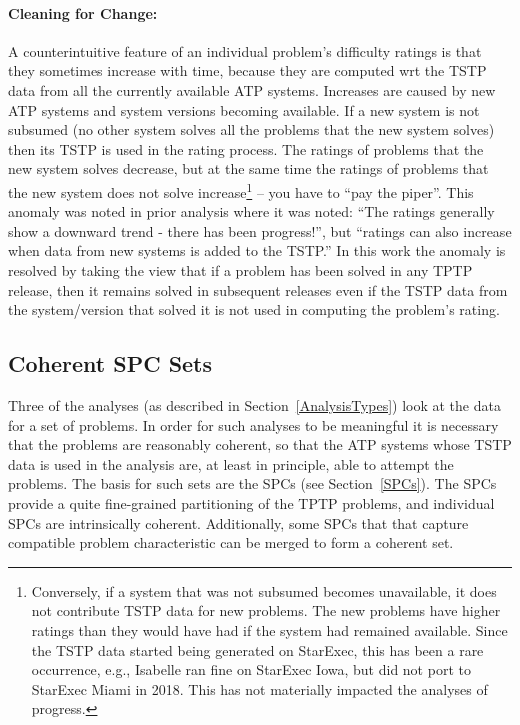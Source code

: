 \documentclass[runningheads]{llncs}
\begin{document}
\paragraph{Cleaning for Change:}
A counterintuitive feature of an individual problem's difficulty ratings is that they sometimes 
increase with time, because they are computed wrt the TSTP data from all the currently available
ATP systems.
Increases are caused by new ATP systems and system versions becoming available.
If a new system is not subsumed (no other system solves all the problems that the new system 
solves) then its TSTP is used in the rating process.
The ratings of problems that the new system solves decrease, but at the same time the ratings of
problems that the new system does not solve increase\footnote{%
Conversely, if a system that was not subsumed becomes unavailable, it does not contribute TSTP
data for new problems.
The new problems have higher ratings than they would have had if the system had remained
available.
Since the TSTP data started being generated on StarExec, this has been a rare occurrence, e.g.,
Isabelle ran fine on StarExec Iowa, but did not port to StarExec Miami in 2018.
This has not materially impacted the analyses of progress.} -- you have to ``pay the piper''.
This anomaly was noted in prior analysis \cite{Sut17} where it was noted: ``The ratings generally 
show a downward trend - there has been progress!'', but ``ratings can also increase when data 
from new systems is added to the TSTP.''
In this work the anomaly is resolved by taking the view that if a problem has been solved in any 
TPTP release, then it remains solved in subsequent releases even if the TSTP data from the 
system/version that solved it is not used in computing the problem's rating.

\subsection{Coherent SPC Sets}
\label{SPCSets}

Three of the analyses (as described in Section~\ref{AnalysisTypes}) look at the data for a set
of problems.
In order for such analyses to be meaningful it is necessary that the problems are reasonably
coherent, so that the ATP systems whose TSTP data is used in the analysis are, at least
in principle, able to attempt the problems.
The basis for such sets are the SPCs (see Section~\ref{SPCs}).
The SPCs provide a quite fine-grained partitioning of the TPTP problems, and individual SPCs
are intrinsically coherent.
Additionally, some SPCs that that capture compatible problem characteristic can be merged
to form a coherent set.
\end{document}
